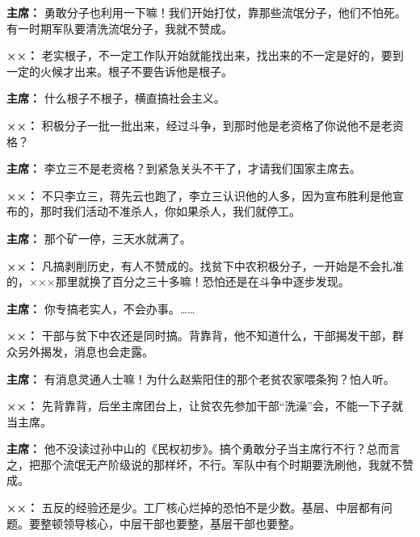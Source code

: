\begin{list}{}
\item[\textbf{主席：}] 勇敢分子也利用一下嘛！我们开始打仗，靠那些流氓分子，他们不怕死。有一时期军队要清洗流氓分子，我就不赞成。

\item[\textbf{××：}] 老实根子，不一定工作队开始就能找出来，找出来的不一定是好的，要到一定的火候才出来。根子不要告诉他是根子。

\item[\textbf{主席：}] 什么根子不根子，横直搞社会主义。

\item[\textbf{××：}] 积极分子一批一批出来，经过斗争，到那时他是老资格了你说他不是老资格？

\item[\textbf{主席：}] 李立三不是老资格？到紧急关头不干了，才请我们国家主席去。

\item[\textbf{××：}] 不只李立三，蒋先云也跑了，李立三认识他的人多，因为宣布胜利是他宣布的，那时我们活动不准杀人，你如果杀人，我们就停工。

\item[\textbf{主席：}] 那个矿一停，三天水就满了。

\item[\textbf{××：}] 凡搞剥削历史，有人不赞成的。找贫下中农积极分子，一开始是不会扎准的，×××那里就换了百分之三十多嘛！恐怕还是在斗争中逐步发现。

\item[\textbf{主席：}] 你专搞老实人，不会办事。……

\item[\textbf{××：}] 干部与贫下中农还是同时搞。背靠背，他不知道什么，干部揭发干部，群众另外揭发，消息也会走露。

\item[\textbf{主席：}] 有消息灵通人士嘛！为什么赵紫阳住的那个老贫农家喂条狗？怕人听。

\item[\textbf{××：}] 先背靠背，后坐主席团台上，让贫农先参加干部“洗澡”会，不能一下子就当主席。

\item[\textbf{主席：}] 他不没读过孙中山的《民权初步》。搞个勇敢分子当主席行不行？总而言之，把那个流氓无产阶级说的那样坏，不行。军队中有个时期要洗刷他，我就不赞成。

\item[\textbf{××：}] 五反的经验还是少。工厂核心烂掉的恐怕不是少数。基层、中层都有问题。要整顿领导核心，中层干部也要整，基层干部也要整。


\end{list}
